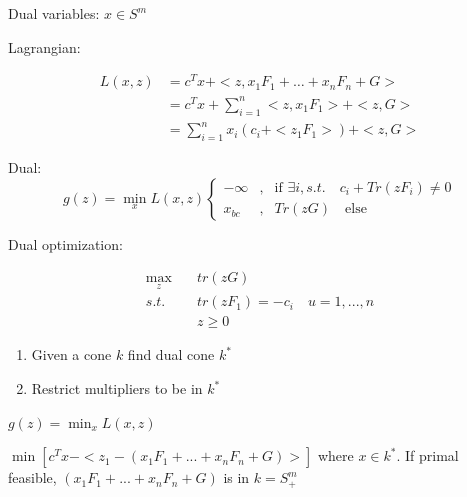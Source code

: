 Dual variables: $x\in S^m$

Lagrangian:

\begin{align*}
L(x,z) &= c^Tx + <z,x_1F_1+\ldots +x_nF_n+G>\\
&= c^Tx + \sum^n_{i=1}<z,x_1F_1>+<z,G>\\
&= \sum^n_{i=1}x_i(c_i+<z_1F_1>)+<z,G>
\end{align*}

Dual:
\begin{equation}
\label{eq6}
g(z) = \min_x L(x,z)\left\{
\begin{aligned}
-\infty & , & \text{if }\exists i,s.t.\quad c_i+Tr(zF_i)\neq0 \\
x_{bc} & , & Tr(zG)\quad\text{else}
\end{aligned}
\right.
\end{equation}

Dual optimization:

\begin{align*}
\max_z\quad &tr(zG)\\
s.t.\quad &tr(zF_1)=-c_i\quad u=1,...,n\\
&z\geq 0
\end{align*}

\begin{enumerate}
	\item Given a cone $k$ find dual cone $k^*$
	
	\item Restrict multipliers to be in $k^*$
\end{enumerate}


$g(z)=\min_x L(x,z)$

$\min[c^Tx-<z_1-(x_1F_1+...+x_nF_n+G)>]$ where $x\in k^*$. If primal feasible, $(x_1F_1+...+x_nF_n+G)$ is in $k=S^m_+$






